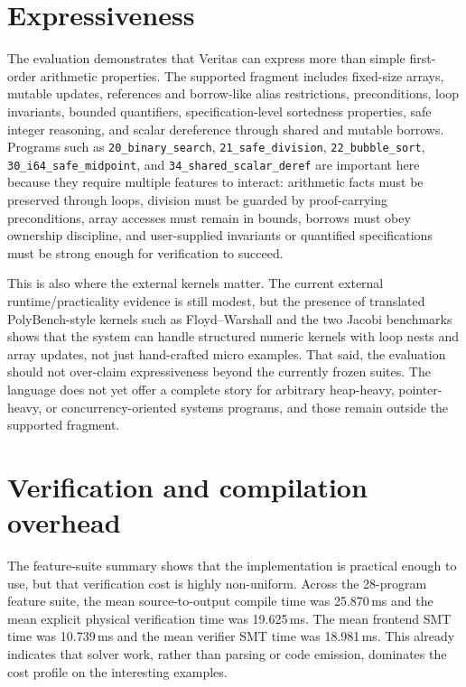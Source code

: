 \section{Expressiveness}

The evaluation demonstrates that Veritas can express more than simple
first-order arithmetic properties. The supported fragment includes fixed-size
arrays, mutable updates, references and borrow-like alias restrictions,
preconditions, loop invariants, bounded quantifiers, specification-level
sortedness properties, safe integer reasoning, and scalar dereference through
shared and mutable borrows. Programs such as \texttt{20\_binary\_search},
\texttt{21\_safe\_division}, \texttt{22\_bubble\_sort},
\texttt{30\_i64\_safe\_midpoint}, and \texttt{34\_shared\_scalar\_deref} are
important here because they require multiple features to interact: arithmetic
facts must be preserved through loops, division must be guarded by
proof-carrying preconditions, array accesses must remain in bounds, borrows
must obey ownership discipline, and user-supplied invariants or quantified
specifications must be strong enough for verification to succeed.

This is also where the external kernels matter. The current external
runtime/practicality evidence is still modest, but the presence of translated
PolyBench-style kernels such as Floyd--Warshall and the two Jacobi benchmarks
shows that the system can handle structured numeric kernels with loop nests and
array updates, not just hand-crafted micro examples. That said, the evaluation
should not over-claim expressiveness beyond the currently frozen suites. The
language does not yet offer a complete story for arbitrary heap-heavy,
pointer-heavy, or concurrency-oriented systems programs, and those remain
outside the supported fragment.

\section{Verification and compilation overhead}

The feature-suite summary shows that the implementation is practical enough to
use, but that verification cost is highly non-uniform. Across the 28-program
feature suite, the mean source-to-output compile time was 25.870\,ms and the
mean explicit physical verification time was 19.625\,ms. The mean frontend SMT
time was 10.739\,ms and the mean verifier SMT time was 18.981\,ms. This already
indicates that solver work, rather than parsing or code emission, dominates the
cost profile on the interesting examples.

